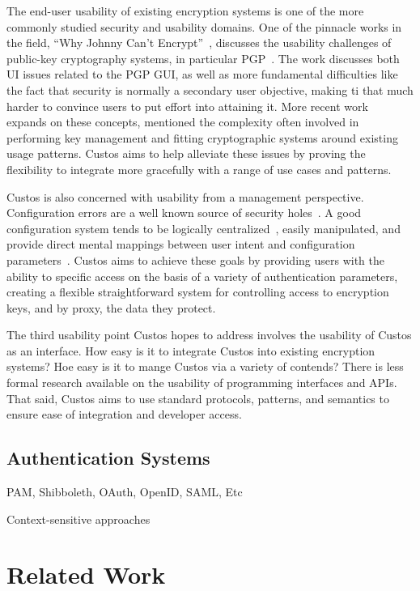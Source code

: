 The end-user usability of existing encryption systems is one of the
more commonly studied security and usability domains. One of the
pinnacle works in the field, ``Why Johnny Can't
Encrypt''~\cite{Whitten1998, Whitten1998}, discusses the usability
challenges of public-key cryptography systems, in particular
PGP~\cite{openpgp}. The work discusses both UI issues related to the
PGP GUI, as well as more fundamental difficulties like the fact that
security is normally a secondary user objective, making ti that much
harder to convince users to put effort into attaining it. More recent
work~\cite{Sweikata2009, Furnell2006, Ibrahim2010} expands on these
concepts, mentioned the complexity often involved in performing key
management and fitting cryptographic systems around existing usage
patterns. Custos aims to help alleviate these issues by proving the
flexibility to integrate more gracefully with a range of use cases and
patterns.

Custos is also concerned with usability from a management
perspective. Configuration errors are a well known source of security
holes~\cite{Bishop1996, kerravala2002configuration}. A good
configuration system tends to be logically
centralized~\cite{Casado2007}, easily manipulated, and provide direct
mental mappings between user intent and configuration
parameters~\cite{norman2002design}. Custos aims to achieve these goals
by providing users with the ability to specific access on the basis of
a variety of authentication parameters, creating a flexible
straightforward system for controlling access to encryption keys, and
by proxy, the data they protect.

The third usability point Custos hopes to address involves the
usability of Custos as an interface. How easy is it to integrate
Custos into existing encryption systems? Hoe easy is it to mange
Custos via a variety of contends? There is less formal research
available on the usability of programming interfaces and APIs. That
said, Custos aims to use standard protocols, patterns, and semantics
to ensure ease of integration and developer access.

\subsection{Authentication Systems}

PAM, Shibboleth, OAuth, OpenID, SAML, Etc

Context-sensitive approaches

\section{Related Work}

